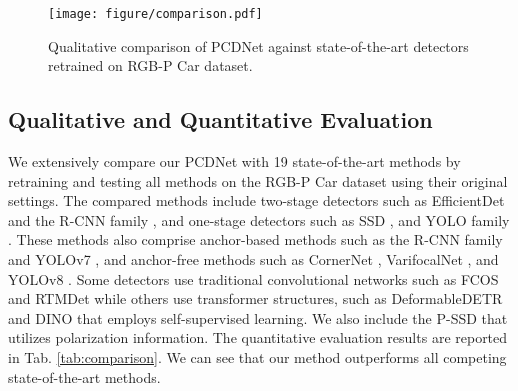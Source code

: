 \begin{figure}[htp]
    \centering
    \begin{center}
        \texttt{[image: figure/comparison.pdf]}
    \end{center}
    \caption{Qualitative comparison of PCDNet against state-of-the-art detectors retrained on RGB-P Car dataset.} 
    \label{fig:comparison}
\end{figure}

\subsection{Qualitative and Quantitative Evaluation}
We extensively compare our PCDNet with 19 state-of-the-art methods by retraining and testing all methods on the RGB-P Car dataset using their original settings. The compared methods include two-stage detectors such as EfficientDet \cite{tan2020efficientdet} and the R-CNN family \cite{Ren_2017, Cai_2019, zhang2020dynamic}, and one-stage detectors such as SSD \cite{liu2016ssd}, and YOLO family \cite{ge2021yolox, wang2022yolov7, ultralytics2023yolov8}. These methods also comprise anchor-based methods such as the R-CNN family and YOLOv7 \cite{wang2022yolov7}, and anchor-free methods such as CornerNet \cite{law2018cornernet}, VarifocalNet \cite{zhang2021varifocalnet}, and YOLOv8 \cite{ultralytics2023yolov8}. Some detectors use traditional convolutional networks such as FCOS \cite{tian2019fcos} and RTMDet \cite{lyu2022rtmdet} while others use transformer structures, such as DeformableDETR \cite{zhu2020deformable} and DINO \cite{zhang2022dino} that employs self-supervised learning. We also include the P-SSD \cite{blin2019road} that utilizes polarization information. The quantitative evaluation results are reported in Tab. \ref{tab:comparison}. We can see that our method outperforms all competing state-of-the-art methods. 

